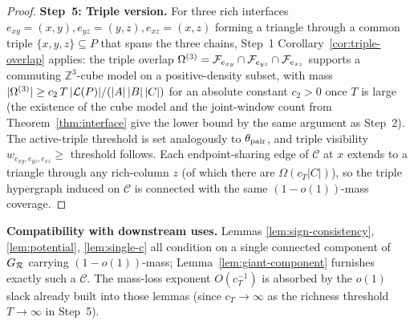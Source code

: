 \begin{proof}
\smallskip
\textbf{Step~5: Triple version.}  For three rich interfaces
$e_{xy}=(x,y),e_{yz}=(y,z),e_{xz}=(x,z)$ forming a triangle through
a common triple $\{x,y,z\}\subseteq P$ that spans the three chains,
Step~1 Corollary~\ref{cor:triple-overlap} applies: the triple
overlap $\Omega^{(3)}=\mathcal{F}_{e_{xy}}\cap\mathcal{F}_{e_{yz}}\cap
\mathcal{F}_{e_{xz}}$ supports a commuting $\mathbb{Z}^3$-cube model on a
positive-density subset, with mass
$|\Omega^{(3)}|\ge c_2\,T\,|\mathcal{L}(P)|/(|A|\,|B|\,|C|)$ for an absolute
constant $c_2>0$ once $T$ is large (the
existence of the cube model and the joint-window count from
Theorem~\ref{thm:interface} give the lower bound by the same
argument as Step~2).  The active-triple threshold is set
analogously to $\theta_{\rm pair}$, and triple visibility
$w_{e_{xy},e_{yz},e_{xz}}\ge$ threshold follows.  Each
endpoint-sharing edge of $\mathcal{C}$ at $x$ extends to a triangle
through any rich-column $z$ (of which there are
$\Omega(c_T|C|)$), so the triple hypergraph induced on
$\mathcal{C}$ is connected with the same $(1-o(1))$-mass coverage.
\end{proof}

\textbf{Compatibility with downstream uses.}  Lemmas
\ref{lem:sign-consistency}, \ref{lem:potential}, \ref{lem:single-c}
all condition on a single connected component of $G_{\mathcal{R}}$
carrying $(1-o(1))$-mass; Lemma~\ref{lem:giant-component} furnishes
exactly such a $\mathcal{C}$.  The mass-loss exponent
$O(c_T^{-1})$ is absorbed by the $o(1)$ slack already built into
those lemmas (since $c_T\to\infty$ as the richness threshold $T\to
\infty$ in Step~5).

